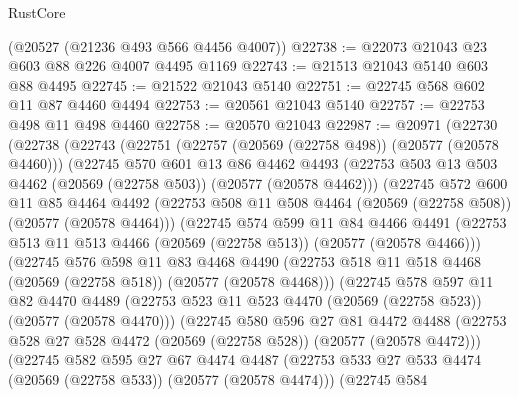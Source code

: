 \begin{lexlean}{RustCore}
\begin{coremodule}
    (@20527 (@21236 @493 @566 @4456 @4007))
@22738 := @22073 @21043 @23 @603 @88 @226 @4007 @4495 @1169
@22743 := @21513 @21043 @5140 @603 @88 @4495
@22745 := @21522 @21043 @5140
@22751 := @22745 @568 @602 @11 @87 @4460 @4494
@22753 := @20561 @21043 @5140
@22757 := @22753 @498 @11 @498 @4460
@22758 := @20570 @21043
@22987 := @20971
    (@22730
      (@22738
        (@22743
          (@22751
            (@22757 (@20569 (@22758 @498)) (@20577 (@20578 @4460)))
            (@22745
              @570
              @601
              @13
              @86
              @4462
              @4493
              (@22753 @503 @13 @503 @4462 (@20569 (@22758 @503)) (@20577 (@20578 @4462)))
              (@22745
                @572
                @600
                @11
                @85
                @4464
                @4492
                (@22753 @508 @11 @508 @4464 (@20569 (@22758 @508)) (@20577 (@20578 @4464)))
                (@22745
                  @574
                  @599
                  @11
                  @84
                  @4466
                  @4491
                  (@22753 @513 @11 @513 @4466 (@20569 (@22758 @513)) (@20577 (@20578 @4466)))
                  (@22745
                    @576
                    @598
                    @11
                    @83
                    @4468
                    @4490
                    (@22753 @518 @11 @518 @4468 (@20569 (@22758 @518)) (@20577 (@20578 @4468)))
                    (@22745
                      @578
                      @597
                      @11
                      @82
                      @4470
                      @4489
                      (@22753 @523 @11 @523 @4470 (@20569 (@22758 @523)) (@20577 (@20578 @4470)))
                      (@22745
                        @580
                        @596
                        @27
                        @81
                        @4472
                        @4488
                        (@22753 @528 @27 @528 @4472 (@20569 (@22758 @528)) (@20577 (@20578 @4472)))
                        (@22745
                          @582
                          @595
                          @27
                          @67
                          @4474
                          @4487
                          (@22753
                            @533
                            @27
                            @533
                            @4474
                            (@20569 (@22758 @533))
                            (@20577 (@20578 @4474)))
                          (@22745
                            @584

\end{coremodule}
\end{lexlean}
